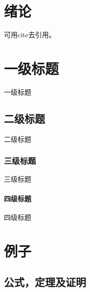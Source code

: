 \documentclass[openany,oneside]{book}
\theoremstyle{cthmstyle}
\theoremstyle{definition}
\theoremstyle{remark}
\begin{document}
\frontmatter
\sloppy %




\tableofcontents
{\xiaosi}
\clearpage{\pagestyle{empty}\cleardoublepage}

\thesissummary

\theesissummary

\mainmatter
{}                        %

\chapter{绪论}

可用cite去引用。\cite{dean2008mapreduce, marxapplication}

\lipsum



\chapter{一级标题}

一级标题

\section{二级标题}

二级标题

\subsection{三级标题}

三级标题

\subsubsection{四级标题}

四级标题

\chapter{例子}

\section{公式，定理及证明}
\end{document}
